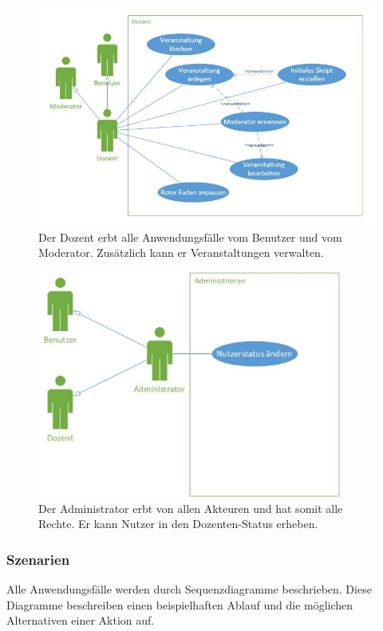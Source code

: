 \documentclass[12pt,a4paper]{article}
\begin{document}
\begin{figure}[H]
	\centering
	\includegraphics[width=\textwidth]{Bilder/Anwendungsfalldiagramme/abbildung3.jpg}
	\caption{Der Dozent erbt alle Anwendungsfälle vom Benutzer und vom Moderator. Zusätzlich kann er Veranstaltungen verwalten.}
	\label{AwfDozent}
\end{figure}

\begin{figure}[H]
	\centering
	\includegraphics[width=10cm]{Bilder/Anwendungsfalldiagramme/Admin.jpg}
	\caption{Der Administrator erbt von allen Akteuren und hat somit alle Rechte. Er kann Nutzer in den Dozenten-Status erheben.}
	\label{AwfAdmin}
\end{figure}

\newpage

\subsubsection{Szenarien}
Alle Anwendungsfälle werden durch Sequenzdiagramme beschrieben. Diese Diagramme beschreiben einen beispielhaften Ablauf und die möglichen Alternativen einer Aktion auf.
\end{document}
